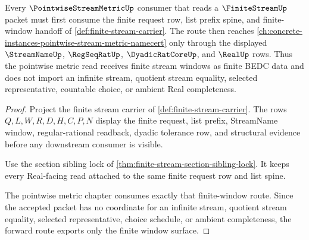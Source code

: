 \begin{theorem}
\label{thm:finite-stream-pointwise-metric-forward-route}
Every $\PointwiseStreamMetricUp$ consumer that reads a $\FiniteStreamUp$ packet must first consume the finite request row, list prefix spine, and finite-window handoff of \autoref{def:finite-stream-carrier}. The route then reaches \autoref{ch:concrete-instances-pointwise-stream-metric-namecert} only through the displayed $\StreamNameUp$, $\RegSeqRatUp$, $\DyadicRatCoreUp$, and $\RealUp$ rows. Thus the pointwise metric read receives finite stream windows as finite BEDC data and does not import an infinite stream, quotient stream equality, selected representative, countable choice, or ambient Real completeness.
\end{theorem}
\begin{proof}
Project the finite stream carrier of \autoref{def:finite-stream-carrier}. The rows $Q,L,W,R,D,H,C,P,N$ display the finite request, list prefix, StreamName window, regular-rational readback, dyadic tolerance row, and structural evidence before any downstream consumer is visible.

Use the section sibling lock of \autoref{thm:finite-stream-section-sibling-lock}. It keeps every Real-facing read attached to the same finite request row and list spine.

The pointwise metric chapter consumes exactly that finite-window route. Since the accepted packet has no coordinate for an infinite stream, quotient stream equality, selected representative, choice schedule, or ambient completeness, the forward route exports only the finite window surface.
\end{proof}
